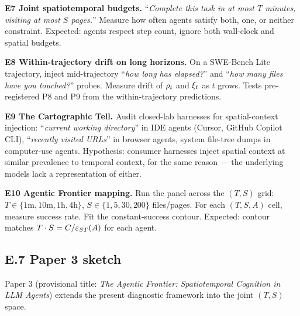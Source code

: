 \textbf{E7 Joint spatiotemporal budgets.} ``\textit{Complete this task in at most $T$ minutes, visiting at most $S$ pages.}'' Measure how often agents satisfy both, one, or neither constraint. Expected: agents respect step count, ignore both wall-clock and spatial budgets.

\textbf{E8 Within-trajectory drift on long horizons.} On a SWE-Bench Lite trajectory, inject mid-trajectory ``\textit{how long has elapsed?}'' and ``\textit{how many files have you touched?}'' probes. Measure drift of $\rho_t$ and $\xi_t$ as $t$ grows. Tests pre-registered P8 and P9 from the within-trajectory predictions.

\textbf{E9 The Cartographic Tell.} Audit closed-lab harnesses for spatial-context injection: ``\textit{current working directory}'' in IDE agents (Cursor, GitHub Copilot CLI), ``\textit{recently visited URLs}'' in browser agents, system file-tree dumps in computer-use agents. Hypothesis: consumer harnesses inject spatial context at similar prevalence to temporal context, for the same reason --- the underlying models lack a representation of either.

\textbf{E10 Agentic Frontier mapping.} Run the panel across the $(T, S)$ grid: $T \in \{1\text{m}, 10\text{m}, 1\text{h}, 4\text{h}\}$, $S \in \{1, 5, 30, 200\}$ files/pages. For each $(T, S, A)$ cell, measure success rate. Fit the constant-success contour. Expected: contour matches $T \cdot S = C/\varepsilon_{ST}(A)$ for each agent.

\subsection*{E.7 Paper 3 sketch}

Paper 3 (provisional title: \emph{The Agentic Frontier: Spatiotemporal Cognition in LLM Agents}) extends the present diagnostic framework into the joint $(T, S)$ space.

